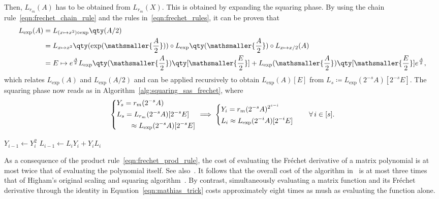 Then, $L_{r_m}(A)$ has to be obtained from $L_{r_m}(X)$. This is obtained by expanding the squaring phase. By using the chain rule~\eqref{eqn:frechet_chain_rule} and the rules in~\eqref{eqn:frechet_rules}, it can be proven that 
\begin{align*}
	L_{\exp}(A) &= L_{(x\mapsto x^2)\circ\exp}\qty(A/2)\\
	 &= L_{x\mapsto x^2}\qty(\exp(\mathsmaller{\frac{A}{2}}))\circ L_{\exp}\qty(\mathsmaller{\frac{A}{2}})\circ L_{x\mapsto x/2}(A)\\
	 &= E\mapsto e^{\frac{A}{2}}L_{\exp}\qty(\mathsmaller{\frac{A}{2}})\qty[\mathsmaller{\frac{E}{2}}]+L_{\exp}(\mathsmaller{\frac{A}{2}})\qty[\mathsmaller{\frac{E}{2}}]e^{\frac{A}{2}},
\end{align*}
which relates $L_{\exp}(A)$ and $L_{\exp}(A/2)$ and can be applied recursively to obtain $L_{\exp}(A)[E]$ from $L_s\coloneqq L_{\exp}(2^{-s}A)[2^{-s}E]$. The squaring phase now reads as in Algorithm~\ref{alg:squaring_sas_frechet}, where
\begin{equation}\label{eqn:Y_L_squaring_sas_frechet}
	\begin{dcases}
		Y_s = r_m(2^{-s}A)\\
		\begin{aligned}
			L_s &= L_{r_m}(2^{-s}A)[2^{-s}E] \\
			 &\ \ \approx L_{\exp}(2^{-s}A)[2^{-s}E]
		\end{aligned}
	\end{dcases}\implies 
	\begin{dcases}
		Y_i = r_m(2^{-s}A)^{2^{s-i}}\\
		L_i \approx L_{\exp}(2^{-i}A)[2^{-i}E]
	\end{dcases}
	\qquad\forall\,i\in[s].
\end{equation}

\begin{algorithm}[htp]
	\caption{\emph{Squaring phase of the scaling and squaring algorithm~\cite{higham:alhi09} that computes the matrix exponential and its Fréchet derivative}}
	\label{alg:squaring_sas_frechet}
	\begin{algorithmic}[0]
			\State $Y_{i-1}\gets Y_i^2$
			\State $L_{i-1}\gets L_iY_i+Y_iL_i$
		\EndFor
	\end{algorithmic}
\end{algorithm}

As a consequence of the product rule~\eqref{eqn:frechet_prod_rule}, the cost of evaluating the Fréchet derivative of a matrix polynomial is at most twice that of evaluating the polynomial itself. See also~\cite[Thm.~4.1]{higham:alhi09}. It follows that the overall cost of the algorithm in~\cite{higham:alhi09} is at most three times that of Higham's original scaling and squaring algorithm~\cite{higham:SaS_revisited}. 
By contrast, simultaneously evaluating a matrix function and its Fréchet derivative through the identity in Equation~\eqref{eqn:mathias_trick} costs approximately eight times as mush as evaluating the function alone.
\smallskip 

